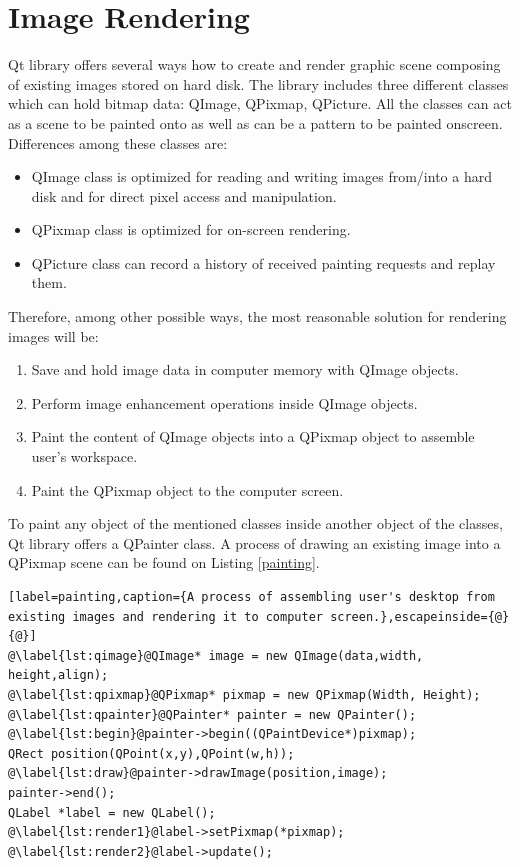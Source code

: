 \section{Image Rendering}
\label{rendering}
Qt library offers several ways how to create and render graphic scene composing of existing images stored on hard disk. The library includes three different classes which can hold bitmap data: QImage, QPixmap, QPicture. All the classes can act as a scene to be painted onto as well as can be a pattern to be painted onscreen. Differences among these classes are\cite{QtDoc}:

\begin{itemize}
\item QImage class is optimized for reading and writing images from/into a hard disk and for direct pixel access and manipulation.
\item QPixmap class is optimized for on-screen rendering.
\item QPicture class can record a history of received painting requests and replay them.
\end{itemize}

Therefore, among other possible ways, the most reasonable solution for rendering images will be:

\begin{enumerate}
  \item Save and hold image data in computer memory with QImage objects.
  \item Perform image enhancement operations inside QImage objects.
  \item Paint the content of QImage objects into a QPixmap object to assemble user's workspace.
  \item Paint the QPixmap object to the computer screen.
\end{enumerate}

To paint any object of the mentioned classes inside another object of the classes, Qt library offers a QPainter class. A process of drawing an existing image into a QPixmap scene can be found on Listing \ref{painting}.

\begin{lstlisting}[label=painting,caption={A process of assembling user's desktop from existing images and rendering it to computer screen.},escapeinside={@}{@}]
@\label{lst:qimage}@QImage* image = new QImage(data,width, height,align);
@\label{lst:qpixmap}@QPixmap* pixmap = new QPixmap(Width, Height);
@\label{lst:qpainter}@QPainter* painter = new QPainter();
@\label{lst:begin}@painter->begin((QPaintDevice*)pixmap);
QRect position(QPoint(x,y),QPoint(w,h));
@\label{lst:draw}@painter->drawImage(position,image);
painter->end();
QLabel *label = new QLabel();
@\label{lst:render1}@label->setPixmap(*pixmap);
@\label{lst:render2}@label->update();
\end{lstlisting}

